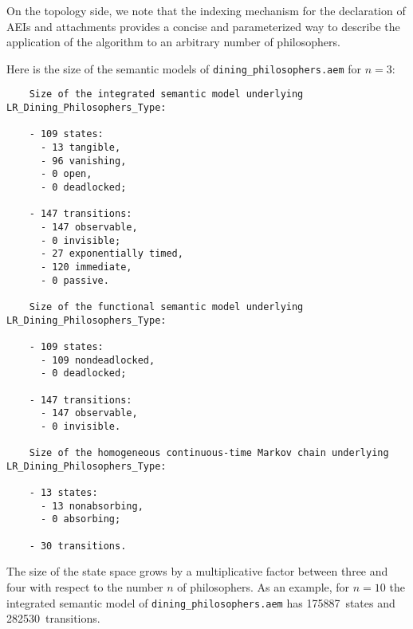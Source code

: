 On the topology side, we note that the indexing mechanism for the declaration of AEIs and attachments
provides a concise and parameterized way to describe the application of the algorithm to an arbitrary number
of philosophers.

Here is the size of the semantic models of {\tt dining\_philosophers.aem} for $n = 3$:

	\begin{verbatim}
    Size of the integrated semantic model underlying LR_Dining_Philosophers_Type:

    - 109 states: 
      - 13 tangible, 
      - 96 vanishing, 
      - 0 open, 
      - 0 deadlocked;

    - 147 transitions:
      - 147 observable,
      - 0 invisible;
      - 27 exponentially timed,
      - 120 immediate,
      - 0 passive.

    Size of the functional semantic model underlying LR_Dining_Philosophers_Type:

    - 109 states: 
      - 109 nondeadlocked, 
      - 0 deadlocked;

    - 147 transitions:
      - 147 observable,
      - 0 invisible.

    Size of the homogeneous continuous-time Markov chain underlying LR_Dining_Philosophers_Type:

    - 13 states: 
      - 13 nonabsorbing, 
      - 0 absorbing;

    - 30 transitions.
	\end{verbatim}

\noindent The size of the state space grows by a multiplicative factor between three and four with respect
to the number $n$ of philosophers. As an example, for $n = 10$ the integrated semantic model of
{\tt dining\_philosophers.aem} has 175887~states and 282530~transitions.
